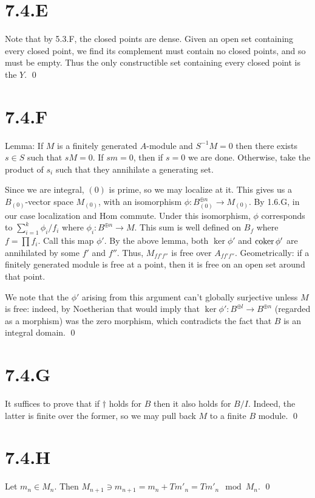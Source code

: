 \documentclass{article}
\begin{document}
\section{7.4.E}
Note that by 5.3.F, the closed points are dense. Given an open set containing
every closed point, we find its complement must contain no closed points, and
so must be empty. Thus the only constructible set containing every closed point
is the $Y$. \qed

\section{7.4.F}
Lemma: If $M$ is a finitely generated
$A$-module and $S^{-1}M=0$ then there exists
$s \in S$ such that $sM=0$. If
$sm=0$, then if $s=0$ we are done.
Otherwise, take the product of $s_i$ such that they
annihilate a generating set.

Since we are integral, $(0)$ is prime, so we may localize at
it. This gives us a $B_{(0)}$-vector space
$M_{(0)}$, with an isomorphism $\phi: B_{(0)}^{\oplus n} \to M_{(0)}$. By 1.6.G,
in our case localization and Hom commute. Under this isomorphism,
$\phi$ corresponds to $\sum_{i=1}^k\phi_i/f_i$ where
$\phi_i: B^{\oplus n} \to M$. This sum is well defined on $B_f$
where $f = \prod f_i$. Call this map $\phi'$. By the
above lemma, both $\ker \phi'$ and $\operatorname{coker} \phi'$ are
annihilated by some $f'$ and $f''$. Thus,
$M_{ff'f''}$ is free over $A_{ff'f''}$. Geometrically: if
a finitely generated module is free at a point, then it is free on an open set
around that point.

We note that the $\phi'$ arising from this argument can't
globally surjective unless $M$ is free: indeed, by
Noetherian that would imply that $\ker \phi': B^{\oplus l} \to B^{\oplus n}$ (regarded as a
morphism) was the zero morphism, which contradicts the fact that
$B$ is an integral domain. \qed

\section{7.4.G}
It suffices to prove that if $\dagger$ holds for
$B$ then it also holds for $B/I$. Indeed,
the latter is finite over the former, so we may pull back
$M$ to a finite $B$ module. \qed

\section{7.4.H}
Let $m_n \in M_n$. Then $M_{n+1} \ni
    m_{n+1}=m_n+Tm'_n=Tm'_n \mod M_n$. \qed
\end{document}
